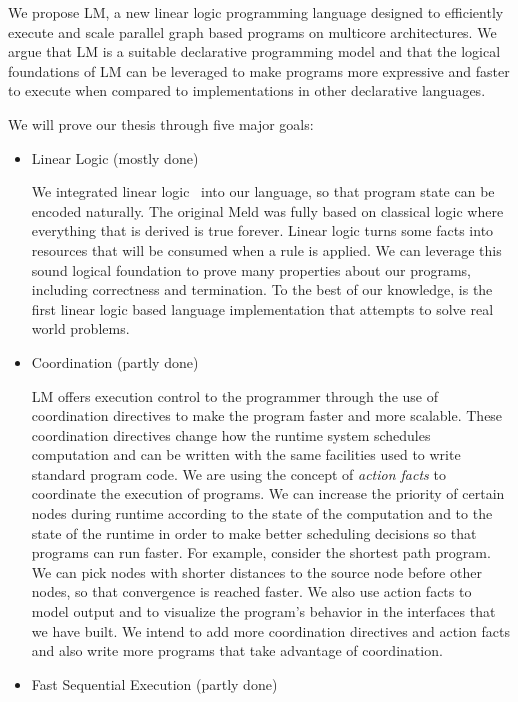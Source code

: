 
We propose LM, a new linear logic programming language designed
to efficiently execute and scale parallel graph based programs on multicore architectures.
We argue that LM is a suitable declarative programming model and that the logical foundations
of LM can be leveraged to make programs more expressive and faster to execute when compared to implementations
in other declarative languages.

We will prove our thesis through five major goals:

\begin{itemize}
   
   \item Linear Logic (mostly done)

   We integrated linear logic~\cite{Girard95logic:its} into our language, so that program state
   can be encoded naturally. The original Meld was fully based on classical logic where everything that
   is derived is true forever. Linear logic turns some facts into resources that will be consumed when a rule is applied.
   We can leverage this sound logical foundation to prove many properties about our programs, including correctness and termination.
   To the best of our knowledge, \lang is the first
   linear logic based language implementation that attempts to solve real world problems.

   \item Coordination (partly done)
   
   LM offers execution control to the programmer through the use of coordination directives to make the program
   faster and more scalable. These coordination
   directives change how the runtime system schedules computation and can be written with the same
   facilities used to write standard program code.
   We are using the concept of \emph{action facts} to coordinate the execution of programs.
   We can increase the priority of certain nodes during runtime according to the state of the
   computation and to the state of the runtime in order to make better scheduling decisions
   so that programs can run faster.
   For example, consider the shortest path program. We can pick nodes with shorter
   distances to the source node before other nodes, so that convergence is reached faster.
   We also use action facts to model output and to visualize the program's behavior in the
   interfaces that we have built. We intend to add more coordination directives and action facts
   and also write more programs that take advantage of coordination.

   \item Fast Sequential Execution (partly done)
   

\end{itemize}
